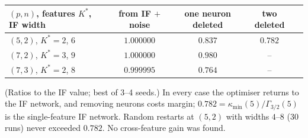 \begin{center}
\begin{tabular}{lcccc}
\toprule
$(p,n)$, features $K^*$, IF width & from IF $+$ noise & one neuron deleted & two deleted\\
\midrule
$(5,2)$, $K^*=2$, $6$ & $1.000000$ & $0.837$ & $0.782$\\
$(7,2)$, $K^*=3$, $9$ & $1.000000$ & $0.980$ & --\\
$(7,3)$, $K^*=2$, $8$ & $0.999995$ & $0.764$ & --\\
\bottomrule
\end{tabular}
\end{center}
(Ratios to the IF value; best of 3--4 seeds.)  In every case the optimiser returns to the IF network, and removing
neurons costs margin; $0.782=\kappa_{\min}(5)/\Gamma_{3/2}(5)$ is the single-feature IF network.  Random restarts at
$(5,2)$ with widths $4$--$8$ (30 runs) never exceeded $0.782$.  No cross-feature gain was found.
